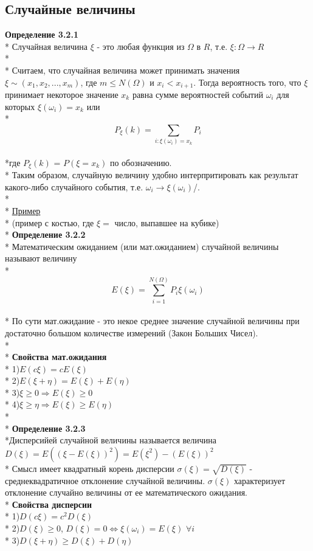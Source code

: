 \documentclass[12pt,a4paper]{article}
\begin{document}
\subsection{Случайные величины}
\textbf{Определение 3.2.1}\\*
Случайная величина $\xi$ - это любая функция из $\Omega$ в $R$, т.е.
$\xi: \Omega \xrightarrow{} R$
\\*
\\*
Считаем, что случайная величина может принимать значения $\xi \sim (x_1, x_2, ..., x_m)$, где $m \leqslant N(\Omega)$ и $x_i < x_{i+1}$. Тогда вероятность того, что $\xi$ принимает некоторое значение $x_k$ равна сумме вероятностей событий $\omega_i$ для которых $\xi(\omega_i) = x_k$ или 
\\*\[P_{\xi}(k) = \sum_{i: \xi(\omega_i) = x_k } P_i\]
\\*где $P_{\xi}(k)$ = $P(\xi = x_k)$ по обозначению.
\\*
Таким образом, случайную величину удобно интерпритировать как результат какого-либо случайного события, т.е. $\omega_i \xrightarrow{} \xi(\omega_i)$/. 
\\* \\*
\underline{Пример}\\*
(пример с костью, где $\xi =$ число, выпавшее на кубике)\\*
\textbf{Определение 3.2.2}\\*
Математическим ожиданием (или мат.ожиданием) случайной величины называют величину
\\*\[E(\xi)=\sum^{N(\Omega)}_{i=1} P_i\xi(\omega_i)\]
\\* По сути мат.ожидание - это некое среднее значение случайной величины при достаточно большом количестве измерений (Закон Больших Чисел).\\*\\*
\textbf{Свойства мат.ожидания}\\*
1)$E(c\xi) = cE(\xi)$\\*
2)$E(\xi + \eta) = E(\xi) + E(\eta)$\\*
3)$\xi \geqslant 0 \Rightarrow E(\xi) \geqslant 0$\\*
4)$\xi \geqslant \eta \Rightarrow E(\xi) \geqslant E(\eta)$ \\*
\\*
\textbf{Определение 3.2.3}
\\*Дисперсийей случайной величины называется величина $D(\xi) = E((\xi - E(\xi))^2)= E(\xi^2) - (E(\xi))^2$\\*
Смысл имеет квадратный корень дисперсии $\sigma(\xi) = \sqrt{D(\xi)}$ - среднеквадратичное отклонение случайной величины. $\sigma(\xi)$ характеризует отклонение случайно величины от ее математического ожидания. 
\\*
\textbf{Свойства дисперсии}\\*
1)$D(c\xi) = c^2D(\xi)$\\*
2)$D(\xi) \geqslant 0$,  $D(\xi) = 0 \Leftrightarrow \xi(\omega_i) = E(\xi)$  $\forall i$\\*
3)$D(\xi + \eta) \geqslant D(\xi) + D(\eta) $
\end{document}
